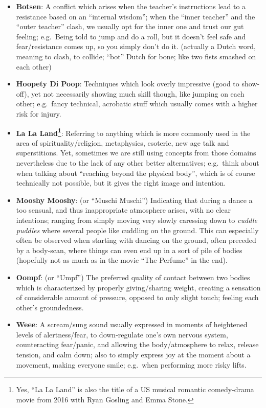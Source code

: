 \begin{itemize}
    \item \textbf{Botsen}: A conflict which arises when the teacher's instructions lead to a resistance based on an ``internal wisdom''; when the ``inner teacher'' and the ``outer teacher'' clash, we usually opt for the inner one and trust our gut feeling; e.g.\ Being told to jump and do a roll, but it doesn't feel safe and fear/resistance comes up, so you simply don't do it.
    (actually a Dutch word, meaning to clash, to collide; ``bot'' Dutch for bone; like two fists smashed on each other)
    \item \textbf{Hoopety Di Poop}: Techniques which look overly impressive (good to show-off), yet not necessarily showing much skill though, like jumping on each other; e.g.\ fancy technical, acrobatic stuff which usually comes with a higher risk for injury.
    \item \textbf{La La Land\footnote{Yes, ``La La Land'' is also the title of a US musical romantic comedy-drama movie from 2016 with Ryan Gosling and Emma Stone.}}: Referring to anything which is more commonly used in the area of spirituality/religion, metaphysics, esoteric, new age talk and superstitions.
    Yet, sometimes we are still using concepts from those domains nevertheless due to the lack of any other better alternatives; e.g.\ think about when talking about ``reaching beyond the physical body'', which is of course technically not possible, but it gives the right image and intention.
    \item \textbf{Mooshy Mooshy}: (or ``Muschi Muschi'') Indicating that during a dance a too sensual, and thus inappropriate atmosphere arises, with no clear intentions; ranging from simply moving very slowly caressing down to \textit{cuddle puddles} where several people like cuddling on the ground.
    This can especially often be observed when starting with dancing on the ground, often preceded by a body-scan, where things can even end up in a sort of pile of bodies (hopefully not as much as in the movie ``The Perfume'' in the end).
    \item \textbf{Oompf}: (or ``Umpf'') The preferred quality of contact between two bodies which is characterized by properly giving/sharing weight, creating a sensation of considerable amount of pressure, opposed to only slight touch; feeling each other's groundedness.
    \item \textbf{Weee}: A scream/sung sound usually expressed in moments of heightened levels of alertness/fear, to down-regulate one's own nervous system, counteracting fear/panic, and allowing the body/atmosphere to relax, release tension, and calm down; also to simply express joy at the moment about a movement, making everyone smile; e.g.\ when performing more risky lifts.
\end{itemize}

